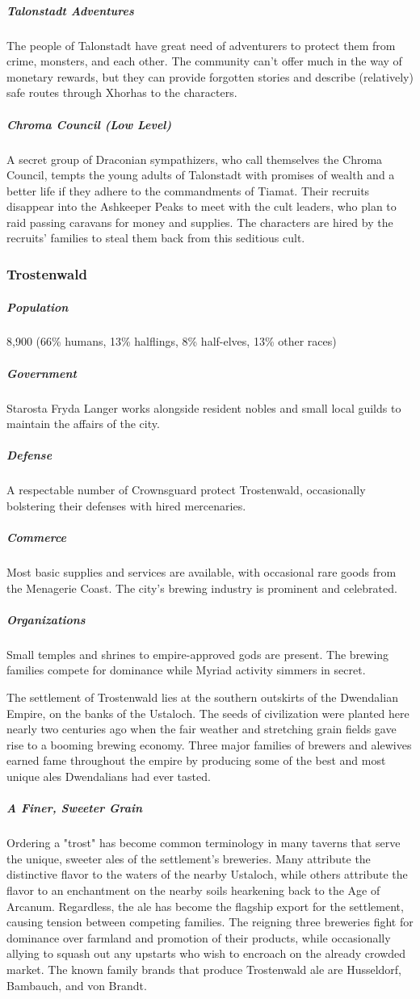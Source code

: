 \documentclass[10pt,a4paper,twoside,bg=print,twocolumn,openany,nodeprecatedcode]{dndbook}
\begin{document}
\subparagraph{Talonstadt Adventures}
The people of Talonstadt have great need of adventurers to protect them from crime, monsters, and each other. The community can't offer much in the way of monetary rewards, but they can provide forgotten stories and describe (relatively) safe routes through Xhorhas to the characters.

\subparagraph{Chroma Council (Low Level)}
A secret group of Draconian sympathizers, who call themselves the Chroma Council, tempts the young adults of Talonstadt with promises of wealth and a better life if they adhere to the commandments of Tiamat. Their recruits disappear into the Ashkeeper Peaks to meet with the cult leaders, who plan to raid passing caravans for money and supplies. The characters are hired by the recruits' families to steal them back from this seditious cult.

\subsubsection{Trostenwald}
\subparagraph{Population}
8,900 (66\% humans, 13\% halflings, 8\% half-elves, 13\% other races)

\subparagraph{Government}
Starosta Fryda Langer works alongside resident nobles and small local guilds to maintain the affairs of the city.

\subparagraph{Defense}
A respectable number of Crownsguard protect Trostenwald, occasionally bolstering their defenses with hired mercenaries.

\subparagraph{Commerce}
Most basic supplies and services are available, with occasional rare goods from the Menagerie Coast. The city's brewing industry is prominent and celebrated.

\subparagraph{Organizations}
Small temples and shrines to empire-approved gods are present. The brewing families compete for dominance while Myriad activity simmers in secret.

The settlement of Trostenwald lies at the southern outskirts of the Dwendalian Empire, on the banks of the Ustaloch. The seeds of civilization were planted here nearly two centuries ago when the fair weather and stretching grain fields gave rise to a booming brewing economy. Three major families of brewers and alewives earned fame throughout the empire by producing some of the best and most unique ales Dwendalians had ever tasted.

\subparagraph{A Finer, Sweeter Grain}
Ordering a "trost" has become common terminology in many taverns that serve the unique, sweeter ales of the settlement's breweries. Many attribute the distinctive flavor to the waters of the nearby Ustaloch, while others attribute the flavor to an enchantment on the nearby soils hearkening back to the Age of Arcanum. Regardless, the ale has become the flagship export for the settlement, causing tension between competing families. The reigning three breweries fight for dominance over farmland and promotion of their products, while occasionally allying to squash out any upstarts who wish to encroach on the already crowded market. The known family brands that produce Trostenwald ale are Husseldorf, Bambauch, and von Brandt.
\end{document}
